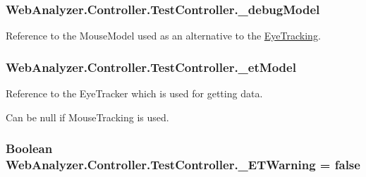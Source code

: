 \subsubsection[{\+\_\+debug\+Model}]{ Web\+Analyzer.\+Controller.\+Test\+Controller.\+\_\+debug\+Model\hspace{0.3cm}{\ttfamily [private]}}\label{class_web_analyzer_1_1_controller_1_1_test_controller_a1c615e40201210940f07312bcc993ef5}


Reference to the Mouse\+Model used as an alternative to the \hyperlink{namespace_web_analyzer_1_1_eye_tracking}{Eye\+Tracking}. 

\hypertarget{class_web_analyzer_1_1_controller_1_1_test_controller_a0db36e46096d444386af0d357905f430}{}
\subsubsection[{\+\_\+et\+Model}]{ Web\+Analyzer.\+Controller.\+Test\+Controller.\+\_\+et\+Model\hspace{0.3cm}{\ttfamily [private]}}\label{class_web_analyzer_1_1_controller_1_1_test_controller_a0db36e46096d444386af0d357905f430}


Reference to the Eye\+Tracker which is used for getting data. 

Can be null if Mouse\+Tracking is used.\hypertarget{class_web_analyzer_1_1_controller_1_1_test_controller_a33b43014ccf6b9f7cdd1e3136ac19d3a}{}
\subsubsection[{\+\_\+\+E\+T\+Warning}]{\setlength{\rightskip}{0pt plus 5cm}Boolean Web\+Analyzer.\+Controller.\+Test\+Controller.\+\_\+\+E\+T\+Warning = false\hspace{0.3cm}{\ttfamily [private]}}\label{class_web_analyzer_1_1_controller_1_1_test_controller_a33b43014ccf6b9f7cdd1e3136ac19d3a}


